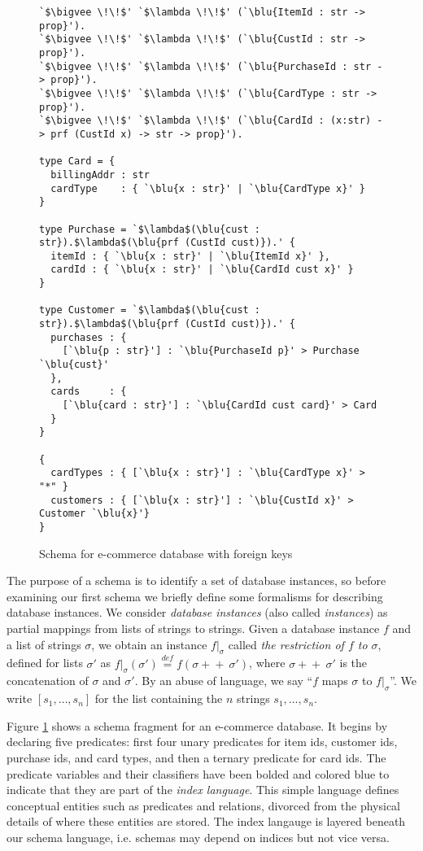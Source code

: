 \documentclass[sigplan,10pt,review,anonymous]{acmart}
\newcommand{\blu}[1]{\textbf{\color{blue}{#1}}}
\newcommand{\defeq}{\overset{\mathit{def}}{=}}
\begin{document}
\begin{figure}

\begin{lstlisting}[escapeinside=`']
`$\bigvee \!\!$' `$\lambda \!\!$' (`\blu{ItemId : str -> prop}').
`$\bigvee \!\!$' `$\lambda \!\!$' (`\blu{CustId : str -> prop}').
`$\bigvee \!\!$' `$\lambda \!\!$' (`\blu{PurchaseId : str -> prop}').
`$\bigvee \!\!$' `$\lambda \!\!$' (`\blu{CardType : str -> prop}').
`$\bigvee \!\!$' `$\lambda \!\!$' (`\blu{CardId : (x:str) -> prf (CustId x) -> str -> prop}').

type Card = {
  billingAddr : str
  cardType    : { `\blu{x : str}' | `\blu{CardType x}' }
}

type Purchase = `$\lambda$(\blu{cust : str}).$\lambda$(\blu{prf (CustId cust)}).' {
  itemId : { `\blu{x : str}' | `\blu{ItemId x}' }, 
  cardId : { `\blu{x : str}' | `\blu{CardId cust x}' }
}

type Customer = `$\lambda$(\blu{cust : str}).$\lambda$(\blu{prf (CustId cust)}).' { 
  purchases : { 
    [`\blu{p : str}'] : `\blu{PurchaseId p}' > Purchase `\blu{cust}' 
  },
  cards     : { 
    [`\blu{card : str}'] : `\blu{CardId cust card}' > Card 
  }
}

{
  cardTypes : { [`\blu{x : str}'] : `\blu{CardType x}' > "*" }
  customers : { [`\blu{x : str}'] : `\blu{CustId x}' > Customer `\blu{x}'}
}
\end{lstlisting}

\caption{Schema for e-commerce database with foreign keys}
\label{fig:ecommerce}
\end{figure}

The purpose of a schema is to identify a set of database instances, so before examining our first schema we briefly define some formalisms for describing database instances. We consider \emph{database instances} (also called \emph{instances}) as partial mappings from lists of strings to strings. Given a database instance $f$ and a list of strings $\sigma$, we obtain an instance $f |_\sigma$ called \emph{the restriction of $f$ to $\sigma$}, defined for lists $\sigma'$ as $f |_\sigma(\sigma') \defeq f(\sigma + \! \! +~\sigma')$, where $\sigma + \! \! +~ \sigma'$ is the concatenation of $\sigma$ and $\sigma'$. By an abuse of language, we say ``$f$ maps $\sigma$ to $f |_{\sigma}$''. We write $[s_1, \ldots, s_n]$ for the list containing the $n$ strings $s_1,\ldots,s_n$. 

Figure \ref{fig:ecommerce} shows a schema fragment for an e-commerce database. It begins by declaring five predicates: first four unary predicates for item ids, customer ids, purchase ids, and card types, and then a ternary predicate for card ids. The predicate variables and their classifiers have been bolded and colored blue to indicate that they are part of the \emph{index language}. This simple language defines conceptual entities such as predicates and relations, divorced from the physical details of where these entities are stored. The index langauge is layered beneath our schema language, i.e. schemas may depend on indices but not vice versa. 
\end{document}
